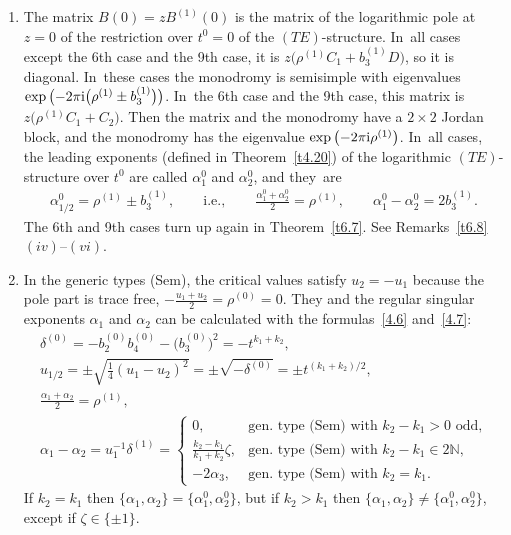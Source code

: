 \documentclass[10pt,a4paper]{amsart}
\numberwithin{equation}{section}
\numberwithin{figure}{section}
\newcommand{\N}{{\mathbb N}}
\begin{document}
\begin{Remarks}\label{t6.4}\qquad
\begin{enumerate}\itemsep=0pt
\item[$(i)$] The matrix $B(0)=zB^{(1)}(0)$ is the matrix of the
logarithmic pole at $z=0$ of the restriction over $t^0=0$
of the $(TE)$-structure. In~all cases except the 6th case and the 9th case, it is
$z\big(\rho^{(1)}C_1+b_3^{(1)}D\big)$, so it is diagonal. In~these cases the monodromy is semisimple with eigenvalues
$\exp\big({-}2\pi {\rm i} \big(\rho^{(1)}\pm b_3^{(1)}\big)\big)$. In~the 6th case and the 9th case,
this matrix is $z\big(\rho^{(1)}C_1+C_2\big)$. Then the matrix and
the monodromy have a $2\times 2$ Jordan block,
and the monodromy has the eigenvalue $\exp\big({-}2\pi {\rm i}\rho^{(1)}\big)$. In~all cases, the leading exponents
(defined in Theorem~\ref{t4.20})
of the logarithmic $(TE)$-structure over $t^0$ are
called $\alpha_1^0$ and $\alpha_2^0$, and they~are
\begin{gather*}%
\alpha_{1/2}^0=\rho^{(1)}\pm b_3^{(1)},\qquad
\text{i.e.},\qquad \frac{\alpha_1^0+\alpha_2^0}{2}=\rho^{(1)},\qquad
\alpha_1^0-\alpha_2^0=2b_3^{(1)}.
\end{gather*}
The 6th and 9th cases turn up again in Theorem~\ref{t6.7}.
See Remarks~\ref{t6.8}$(iv)$--$(vi)$.

\item[$(ii)$] In the generic types (Sem), the critical values satisfy
$u_2=-u_1$ because the pole part is trace free,
$-\frac{u_1+u_2}{2}=\rho^{(0)}=0$.
They and the regular singular exponents $\alpha_1$ and
$\alpha_2$ can be calculated with the formulas~\eqref{4.6} and~\eqref{4.7}:
\begin{gather}\label{6.22}
\delta^{(0)}= -b_2^{(0)}b_4^{(0)}-\big(b_3^{(0)}\big)^2=-t^{k_1+k_2},
\\
u_{1/2}=\pm\sqrt{\frac{1}{4}(u_1-u_2)^2}=\pm\sqrt{-\delta^{(0)}}
=\pm t^{(k_1+k_2)/2},\label{6.23}
\\
\frac{\alpha_1+\alpha_2}{2}= \rho^{(1)}, \label{6.24}
\\
\alpha_1-\alpha_2= u_1^{-1}\delta^{(1)}
= \begin{cases}
0,& \text{gen. type (Sem) with }k_2-k_1>0\text{ odd,}\\
\frac{k_2-k_1}{k_1+k_2}\zeta,
& \text{gen. type (Sem) with }k_2-k_1\in 2\N,\\
-2\alpha_3,& \text{gen. type (Sem) with }k_2=k_1.
\end{cases} \label{6.25}
\end{gather}
If $k_2=k_1$ then $\{\alpha_1,\alpha_2\}
=\big\{\alpha_1^0,\alpha_2^0\big\}$, but if
$k_2>k_1$ then $\{\alpha_1,\alpha_2\}\neq
\big\{\alpha_1^0,\alpha_2^0\big\}$, except if $\zeta\in\{\pm 1\}$.


\end{enumerate}
\end{Remarks}
\end{document}

